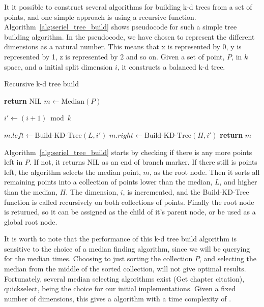 It it possible to construct several algorithms for building k-d trees from a set of points, and one simple approach is using a recursive function. Algorithm~\ref{alg:seriel_tree_build} shows pseudocode for such a simple tree building algorithm. In the pseudocode, we have chosen to represent the different dimensions as a natural number. This means that x is represented by 0, y is represented by 1, z is represented by 2 and so on. Given a set of point, $P$, in $k$ space, and a initial split dimension $i$, it constructs a balanced k-d tree.

\begin{algorithm}
\caption{Recursive k-d tree build}
\label{alg:seriel_tree_build}
\begin{algorithmic}
         
            \State \textbf{return} NIL
        \Else
            \State $m \gets \text{Median}(P)$

            \State {}
            \State {}

            \State $i' \gets (i + 1) \bmod k$ 

            \State $m.left \gets \text{Build-KD-Tree}(L, i')$
            \State $m.right \gets \text{Build-KD-Tree}(H, i')$
        \EndIf
        \State \textbf{return} $m$
    \EndFunction
\end{algorithmic}
\end{algorithm}

Algorithm~\ref{alg:seriel_tree_build} starts by checking if there is any more points left in $P$. If not, it returns NIL as an end of branch marker. If there still is points left, the algorithm selects the median point, $m$, as the root node. Then it sorts all remaining points into a collection of points lower than the median, $L$, and higher than the median, $H$. The dimension, $i$, is incremented, and the Build-KD-Tree function is called recursively on both collections of points. Finally the root node is returned, so it can be assigned as the child of it's parent node, or be used as a global root node.

It is worth to note that the performance of this k-d tree build algorithm is sensitive to the choice of a median finding algorithm, since we will be querying for the median  times. Choosing to just sorting the collection $P$, and selecting the median from the middle of the sorted collection, will not give optimal results. Fortunately, several  median selecting algorithms exist\cite{Cormen:2001} (Get chapter citation), quickselect, being the choice for our initial implementations. Given a fixed number of dimensions, this gives a algorithm with a time complexity of \cite{Friedman:1977}.

